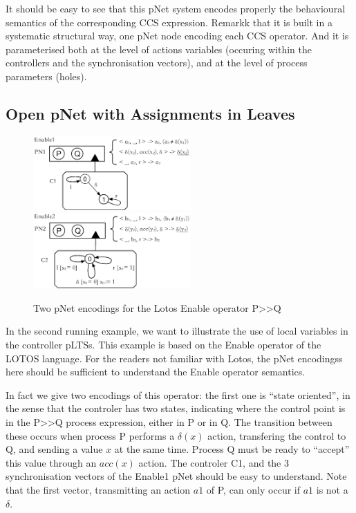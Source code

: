 \documentclass{lncs/llncs}
\begin{document}
It should be easy to see that this pNet system encodes properly the
behavioural semantics of the corresponding CCS expression. Remarkk
that it is built in a systematic structural way, one pNet node
encoding each CCS operator. And it is parameterised both at the level
of actions variables (occuring within the controllers and the synchronisation
vectors), and at the level of process parameters 
(holes). 

\subsection{Open pNet with Assignments in Leaves}
\begin{figure}[h]

  \includegraphics[width=6cm]{XFIG/Enable1.eps}
  \includegraphics[width=6cm]{XFIG/Enable2.eps}
  \caption{Two pNet encodings for the Lotos Enable operator P>>Q }  \label{schema:enable-pnets}

\end{figure}

In the second running example, we want to illustrate the use of local
variables in the controller pLTSs. This example is based on the Enable
operator of the LOTOS language. For the readers not familiar with
Lotos, the pNet encodingss here should be sufficient to understand the
Enable operator semantics.

In fact we give two encodings of this operator: the first one is
``state oriented'', in the sense that the controler has two states,
indicating where the control point is in the P>>Q process expression,
either in P or in Q. The transition between these occurs when process
P performs a $\delta(x)$ action, transfering the control to Q, and
sending a value $x$ at the same time. Process Q must be ready to
``accept'' this value through an $acc(x)$ action. The controler C1,
and the 3 synchronisation vectors of the Enable1 pNet should be easy
to understand. Note 
that the first vector, transmitting an action $a1$ of P, can only
occur if $a1$ is not a $\delta$.
\end{document}
